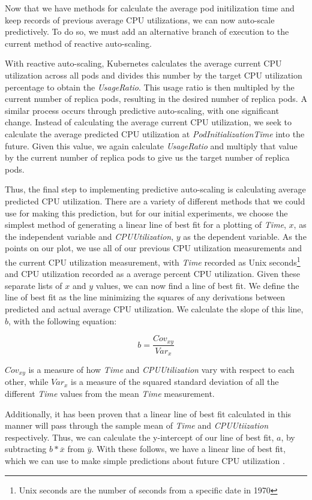 Now that we have methods for calculate the average pod initilization time and
keep records of previous average CPU utilizations, we can now auto-scale
predictively. To do so, we must add an alternative branch of execution to the
current method of reactive auto-scaling.

With reactive auto-scaling, Kubernetes calculates the average current CPU utilization
across all pods and divides this number by the target CPU utilization
percentage to obtain the \textit{UsageRatio}. This usage ratio is then multipled
by the current number of replica pods, resulting in the desired number of
replica pods. A similar process occurs through predictive auto-scaling, with one
significant change. Instead of calculating the average current CPU utilization,
we seek to calculate the average predicted CPU utilization at
\textit{PodInitializationTime} into the future. Given this value, we again
calculate \textit{UsageRatio} and multiply that value by the current number of
replica pods to give us the target number of replica pods.

Thus, the final step to implementing predictive auto-scaling is calculating
average predicted CPU utilization. There are a variety of different methods that
we could use for making this prediction, but for our initial experiments, we
choose the simplest method of generating a linear line of best fit for a
plotting of \textit{Time}, $x$, as the independent variable and
\textit{CPUUtilization}, $y$ as the dependent variable. As the points on our plot, we
use all of our previous CPU utilization measurements and the current CPU
utilization measurement, with \textit{Time}
recorded as Unix seconds\footnote{Unix seconds are the number of seconds from a
specific date in 1970} and CPU utilization recorded as a average percent CPU
utilization. Given these separate lists of $x$ and $y$ values, we can now find a
line of best fit. We define the line of best fit as the line minimizing the
squares of any derivations between predicted and actual average CPU utilization.
We calculate the slope of this line, $b$, with the following equation:

\[ b = \frac{Cov_{xy}}{Var_{x}}\]

$Cov_{xy}$ is a measure of how \textit{Time} and \textit{CPUUtilization} vary
with respect to each other, while $Var_{{x}}$ is a measure of the squared standard
deviation of all the different \textit{Time} values from the mean \textit{Time}
measurement.

Additionally, it has been proven that a linear line of best fit calculated in
this manner will pass through the sample mean of \textit{Time} and
\textit{CPUUtiization} respectively. Thus, we can calculate the y-intercept of
our line of best fit, $a$, by subtracting $b * \overline{x}$ from $\overline{y}$. With
these follows, we have a linear line of best fit, which we can use to make
simple predictions about future CPU utilization \cite{line-of-best-fit}.

